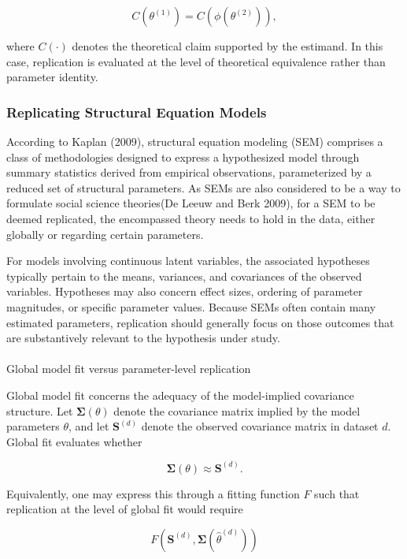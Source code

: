 \documentclass[
  12pt,
  letterpaper,
  man]{apa7}
\makeatletter
\let\oldparagraph\paragraph
\renewcommand{\paragraph}{
    \@ifstar
      \xxxParagraphStar
      \xxxParagraphNoStar
  }
\newcommand{\xxxParagraphStar}[1]{\oldparagraph*{#1}\mbox{}}
\newcommand{\xxxParagraphNoStar}[1]{\oldparagraph{#1}\mbox{}}
\makeatother
\begin{document}
\[C(\theta^{(1)}) = C(\phi(\theta^{(2)})), \]

where \(C(\cdot)\) denotes the theoretical claim supported by the
estimand. In this case, replication is evaluated at the level of
theoretical equivalence rather than parameter identity.

\subsubsection{Replicating Structural Equation
Models}\label{replicating-structural-equation-models}

According to Kaplan (2009), structural equation modeling (SEM) comprises
a class of methodologies designed to express a hypothesized model
through summary statistics derived from empirical observations,
parameterized by a reduced set of structural parameters. As SEMs are
also considered to be a way to formulate social science theories(De
Leeuw and Berk 2009), for a SEM to be deemed replicated, the encompassed
theory needs to hold in the data, either globally or regarding certain
parameters.

For models involving continuous latent variables, the associated
hypotheses typically pertain to the means, variances, and covariances of
the observed variables. Hypotheses may also concern effect sizes,
ordering of parameter magnitudes, or specific parameter values. Because
SEMs often contain many estimated parameters, replication should
generally focus on those outcomes that are substantively relevant to the
hypothesis under study.

\paragraph{Global model fit versus parameter-level
replication}\label{global-model-fit-versus-parameter-level-replication}

Global model fit concerns the adequacy of the model-implied covariance
structure. Let \(\boldsymbol{\Sigma}(\theta)\) denote the covariance
matrix implied by the model parameters \(\theta\), and let
\(\mathbf{S}^{(d)}\) denote the observed covariance matrix in dataset
\(d\). Global fit evaluates whether

\[\boldsymbol{\Sigma}(\theta) \approx \mathbf{S}^{(d)}.\]

Equivalently, one may express this through a fitting function \(F\) such
that replication at the level of global fit would require

\[F\left(\mathbf{S}^{(d)}, \boldsymbol{\Sigma}(\hat{\theta}^{(d)})\right) \]
\end{document}
